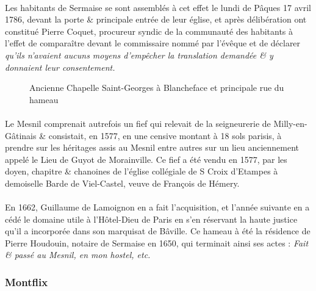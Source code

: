 \documentclass[../eBook.tex]{subfiles}
\begin{document}
      \paragraph{}Les habitants de Sermaise se sont assemblés à cet effet le lundi de Pâques 17 avril 1786, devant la porte \& principale entrée de leur église, et après délibération ont constitué Pierre Coquet, procureur syndic de la communauté des habitants à l'effet de comparaître devant le commissaire nommé par l'évêque et de déclarer \og \textit{qu'ils n'avaient aucuns moyens d'empêcher la translation demandée \& y donnaient leur consentement.}\fg{}
      \begin{center}
         \begin{figure}[!ht]
          \captionsetup{justification=centering}
          \caption*{Ancienne Chapelle Saint-Georges à Blancheface et principale rue du hameau}
        \end{figure}
       \end{center}
      \paragraph{}Le Mesnil comprenait autrefois un fief qui relevait de la seigneurerie de Milly-en-Gâtinais \& consistait, en 1577, en une censive montant à 18 sols parisis, à prendre sur les héritages assis au Mesnil entre autres sur un lieu anciennement appelé le Lieu de Guyot de Morainville. Ce fief a été vendu en 1577, par les doyen, chapitre \& chanoines de l'église collégiale de S Croix d'Etampes à demoiselle Barde de Viel-Castel, veuve de François de Hémery.
      \paragraph{}En 1662, Guillaume de Lamoignon en a fait l'acquisition, et l'année suivante en a cédé le domaine utile à l'Hôtel-Dieu de Paris en s'en réservant la haute justice qu'il a incorporée dans son marquisat de Bâville. Ce hameau à été la résidence de Pierre Houdouin, notaire de Sermaise en 1650, qui terminait ainsi ses actes : \og \textit{Fait \& passé au Mesnil, en mon hostel, etc.} \fg{}

    \subsubsection*{Montflix}
\end{document}
